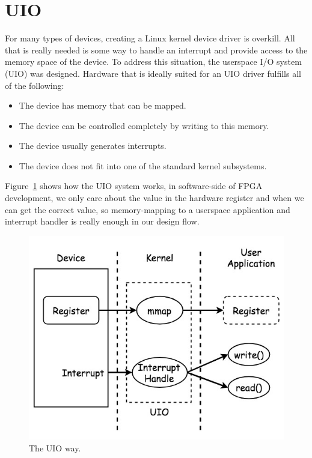 \section{UIO}
\label{sec:UIO}
For many types of devices, creating a Linux kernel device driver is overkill. All that is really needed 
is some way to handle an interrupt and provide access to the memory space of the device. To address 
this situation, the userspace I/O system (UIO) was designed. Hardware that is ideally suited for an 
UIO driver fulfills all of the following:
%
\begin{itemize}
\item The device has memory that can be mapped.
\item The device can be controlled completely by writing to this memory.
\item The device usually generates interrupts.
\item The device does not fit into one of the standard kernel subsystems.
\end{itemize}
%
Figure~\ref{fig:UIO Driver} shows how the UIO system works, in software-side of FPGA development, we 
only care about the value in the hardware register and when we can get the correct value, so memory-mapping 
to a userspace application and interrupt handler is really enough in our design flow\cite{howtoUIO}.  
%
\begin{figure}[!htb]
  \centering
  \includegraphics[scale=0.5]{images/uio.jpg}
  \caption[The UIO way.]{The UIO way.}
  \label{fig:UIO Driver}
\end{figure}


